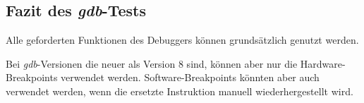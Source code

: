 \subsection{Fazit des \textit{gdb}-Tests}
Alle geforderten Funktionen des Debuggers können grundsätzlich genutzt werden.

Bei \textit{gdb}-Versionen die neuer als Version 8 sind, können aber nur die Hardware-Breakpoints verwendet werden.
Software-Breakpoints könnten aber auch verwendet werden, wenn die ersetzte Instruktion manuell wiederhergestellt wird.



